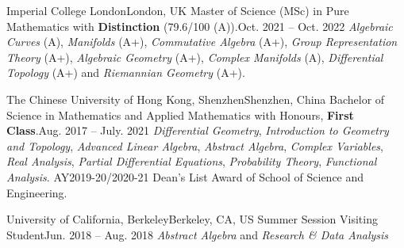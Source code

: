 \HeadingItemListStart
	\HeadingItem
		{Imperial College London}{London, UK}
		{Master of Science (MSc) in Pure Mathematics with \textbf{Distinction} (79.6/100 (A)).}{Oct. 2021 -- Oct. 2022}
		\ItemListStart
				{\textit{Algebraic Curves} (A),
				\textit{Manifolds} (A+),
				\textit{Commutative Algebra} (A+),
				\textit{Group Representation Theory} (A+),
				\textit{Algebraic Geometry} (A+),
				\textit{Complex Manifolds} (A),
				\textit{Differential Topology} (A+)
				and \textit{Riemannian Geometry} (A+).}
		\ItemListEnd

	\HeadingItem
		{The Chinese University of Hong Kong, Shenzhen}{Shenzhen, China}
		{Bachelor of Science in Mathematics and Applied Mathematics with Honours, \textbf{First Class}.}{Aug. 2017 -- July. 2021}
		\ItemListStart
				{\textit{Differential Geometry}, \textit{Introduction to Geometry and Topology}, \textit{Advanced Linear Algebra}, \textit{Abstract Algebra}, \textit{Complex Variables}, \textit{Real Analysis}, \textit{Partial Differential Equations}, \textit{Probability Theory}, \textit{Functional Analysis}.}
				{AY2019-20/2020-21 Dean's List Award of School of Science and Engineering.}
		\ItemListEnd

	\HeadingItem
		{University of California, Berkeley}{Berkeley, CA, US}
		{Summer Session Visiting Student}{Jun. 2018 -- Aug. 2018}
		\ItemListStart
				{\textit{Abstract Algebra} and \textit{Research \& Data Analysis}}
		\ItemListEnd
		
\HeadingItemListEnd